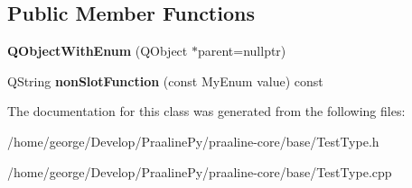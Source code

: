 \subsection*{Public Member Functions}
\begin{DoxyCompactItemize}
\item 
\mbox{\label{class_q_object_with_enum_a565bfe05aea0b7c21d4047412a527085}} 
{\bfseries Q\+Object\+With\+Enum} (Q\+Object $\ast$parent=nullptr)
\item 
\mbox{\label{class_q_object_with_enum_a9e909b228ad09aa7126151130e643910}} 
Q\+String {\bfseries non\+Slot\+Function} (const My\+Enum value) const
\end{DoxyCompactItemize}


The documentation for this class was generated from the following files\+:\begin{DoxyCompactItemize}
\item 
/home/george/\+Develop/\+Praaline\+Py/praaline-\/core/base/Test\+Type.\+h\item 
/home/george/\+Develop/\+Praaline\+Py/praaline-\/core/base/Test\+Type.\+cpp\end{DoxyCompactItemize}

